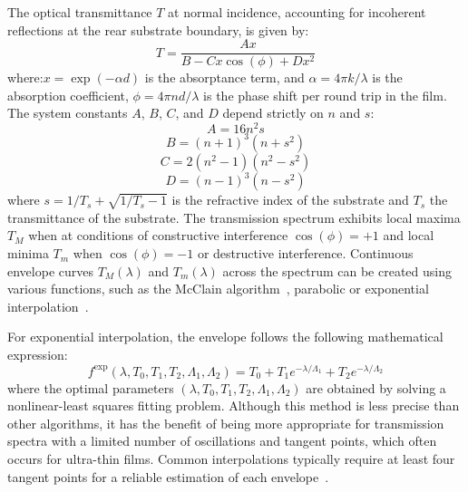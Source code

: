 The optical transmittance $T$ at normal incidence, accounting for incoherent reflections at the rear substrate boundary, is given by:
\begin{equation} \label{eqn: transmission_swanepoel}
	T = \frac{A x}{B - C x \cos(\phi) + D x^2}
\end{equation}
where:$x = \exp(-\alpha d)$ is the absorptance term, and $\alpha = {4\pi k}/{\lambda}$ is the absorption coefficient, $\phi = {4\pi n d}/{\lambda}$ is the phase shift per round trip in the film. The system constants $A$, $B$, $C$, and $D$ depend strictly on $n$ and $s$:
\[A = 16 n^2 s\]
\[B = {(n + 1)}^3 (n + s^2)\]
\[C = 2 (n^2 - 1) (n^2 - s^2)\]
\[D = {(n - 1)}^3 (n - s^2)\]
where $s=1/T_s+\sqrt{1/T_s-1}$ is the refractive index of the substrate and $T_s$ the transmittance of the substrate. The transmission spectrum exhibits local maxima $T_M$ when at conditions of constructive interference $\cos(\phi) = +1$ and local minima $T_m$ when $\cos(\phi) = -1$ or destructive interference. Continuous envelope curves $T_M(\lambda)$ and $T_m(\lambda)$ across the spectrum can be created using various functions, such as the McClain algorithm~\cite{mcclainAlgorithmComputerProgram1991}, parabolic or exponential interpolation~\cite{ballesterEnhancingSwanepoelMethod2025}. 

For exponential interpolation, the envelope follows the following mathematical expression:
\begin{equation} \label{eqn: swanepoel_exp}
	f^{\exp}(\lambda, T_0, T_1, T_2, \Lambda_1, \Lambda_2)=T_0+T_1e^{-\lambda/\Lambda_1}+T_2e^{-\lambda/\Lambda_2}
\end{equation}
where the optimal parameters $(\lambda, T_0, T_1, T_2, \Lambda_1, \Lambda_2)$ are obtained by solving a nonlinear-least squares fitting problem. Although this method is less precise than other algorithms, it has the benefit of being more appropriate for transmission spectra with a limited number of oscillations and tangent points, which often occurs for ultra-thin films. Common interpolations typically require at least four tangent points for a reliable estimation of each envelope~\cite{ballesterEnhancingSwanepoelMethod2025,mcclainAlgorithmComputerProgram1991}. 


